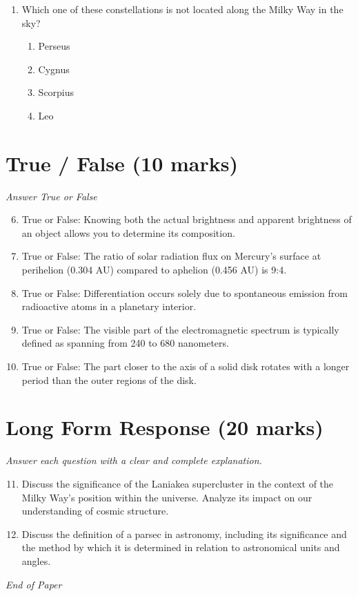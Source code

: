 \documentclass[12pt]{article}
\begin{document}
\begin{enumerate}[label=\arabic*.]
\begin{enumerate}[label=(\alph*)]
    \item metals sank to the center during a time when the interiors were molten throughout.
    \item radioactivity created metals in the core from the decay of uranium.
\end{enumerate}
\item Which one of these constellations is not located along the Milky Way in the sky?
\begin{enumerate}[label=(\alph*)]
    \item Perseus
    \item Cygnus
    \item Scorpius
    \item Leo
\end{enumerate}
\end{enumerate}

\section*{True / False (10 marks)}
\textit{Answer True or False}
\begin{enumerate}[label=\arabic*.]
\setcounter{enumi}{5}
\item True or False: Knowing both the actual brightness and apparent brightness of an object allows you to determine its composition.
\item True or False: The ratio of solar radiation flux on Mercury's surface at perihelion (0.304 AU) compared to aphelion (0.456 AU) is 9:4.
\item True or False: Differentiation occurs solely due to spontaneous emission from radioactive atoms in a planetary interior.
\item True or False: The visible part of the electromagnetic spectrum is typically defined as spanning from 240 to 680 nanometers.
\item True or False: The part closer to the axis of a solid disk rotates with a longer period than the outer regions of the disk.
\end{enumerate}

\section*{Long Form Response (20 marks)}
\textit{Answer each question with a clear and complete explanation.}
\begin{enumerate}[label=\arabic*.]
\setcounter{enumi}{10}
\item Discuss the significance of the Laniakea supercluster in the context of the Milky Way's position within the universe. Analyze its impact on our understanding of cosmic structure.
\item Discuss the definition of a parsec in astronomy, including its significance and the method by which it is determined in relation to astronomical units and angles.
\end{enumerate}

\vfill
\noindent\textit{End of Paper}
\end{document}
